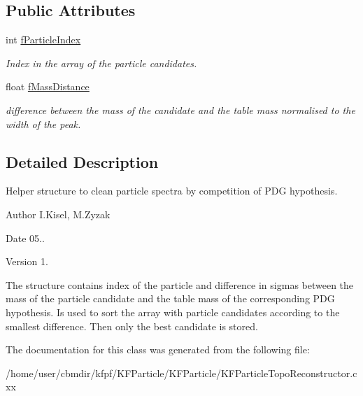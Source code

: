 \subsection*{Public Attributes}
\begin{DoxyCompactItemize}
\item 
int \hyperlink{structParticleInfo_ad769e2f55c7c497f18006bd9789d66bd}{f\+Particle\+Index}\hypertarget{structParticleInfo_ad769e2f55c7c497f18006bd9789d66bd}{}\label{structParticleInfo_ad769e2f55c7c497f18006bd9789d66bd}

\begin{DoxyCompactList}\small\item\em Index in the array of the particle candidates. \end{DoxyCompactList}\item 
float \hyperlink{structParticleInfo_af54646ed2dd661f250c556d41769e3c9}{f\+Mass\+Distance}\hypertarget{structParticleInfo_af54646ed2dd661f250c556d41769e3c9}{}\label{structParticleInfo_af54646ed2dd661f250c556d41769e3c9}

\begin{DoxyCompactList}\small\item\em difference between the mass of the candidate and the table mass normalised to the width of the peak. \end{DoxyCompactList}\end{DoxyCompactItemize}


\subsection{Detailed Description}
Helper structure to clean particle spectra by competition of P\+DG hypothesis. 

\begin{DoxyAuthor}{Author}
I.\+Kisel, M.\+Zyzak 
\end{DoxyAuthor}
\begin{DoxyDate}{Date}
05.. 
\end{DoxyDate}
\begin{DoxyVersion}{Version}
1.
\end{DoxyVersion}
The structure contains index of the particle and difference in sigmas between the mass of the particle candidate and the table mass of the corresponding P\+DG hypothesis. Is used to sort the array with particle candidates according to the smallest difference. Then only the best candidate is stored. 

The documentation for this class was generated from the following file\+:\begin{DoxyCompactItemize}
\item 
/home/user/cbmdir/kfpf/\+K\+F\+Particle/\+K\+F\+Particle/K\+F\+Particle\+Topo\+Reconstructor.\+cxx\end{DoxyCompactItemize}
